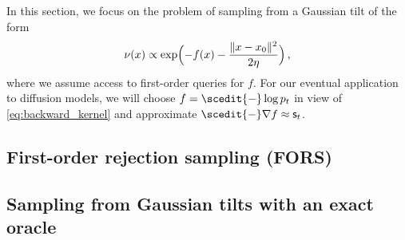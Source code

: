 

In this section, we focus on the problem of sampling from a Gaussian tilt of the form
\begin{align}\label{eq:RGO}
    \rgo(x)\propto \exp\prn[\Big]{-f(x)-\frac{\nrm{x-\xz}^2}{2\eta}}\,,
\end{align}
where we assume access to first-order queries for $f$. For our eventual application to diffusion models, we will choose $f=\scedit{-}\log p_t$ in view of \cref{eq:backward_kernel} and approximate $\scedit{-}\nabla f\approx \scf_t$. 

\subsection{First-order rejection sampling (FORS)}\label{sec:motivation}


\subsection{Sampling from Gaussian tilts with an exact oracle}

